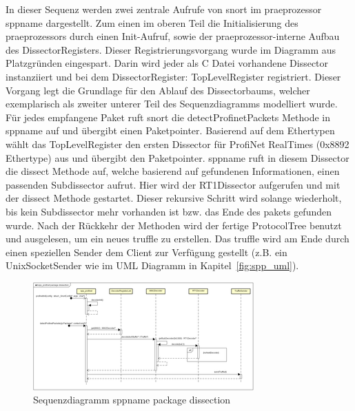 
In dieser Sequenz werden zwei zentrale Aufrufe von \gls{snort} im \gls{praeprozessor} \gls{sppname} dargestellt. Zum einen im oberen Teil die Initialisierung des \gls{praeprozessor}s durch einen Init-Aufruf, sowie der \gls{praeprozessor}-interne Aufbau des DissectorRegisters. Dieser Registrierungsvorgang wurde im Diagramm aus Platzgründen eingespart. Darin wird jeder als C Datei vorhandene Dissector instanziiert und bei dem DissectorRegister: TopLevelRegister registriert. Dieser Vorgang legt die Grundlage für den Ablauf des Dissectorbaums, welcher exemplarisch als zweiter unterer Teil des Sequenzdiagramms modelliert wurde. Für jedes empfangene Paket ruft \gls{snort} die detectProfinetPackets Methode in \gls{sppname} auf und übergibt einen Paketpointer. Basierend auf dem Ethertypen wählt das TopLevelRegister den ersten Dissector für ProfiNet RealTimes (0x8892 Ethertype) aus und übergibt den Paketpointer. \gls{sppname} ruft in diesem Dissector die dissect Methode auf, welche basierend auf gefundenen Informationen, einen passenden Subdissector aufrut. Hier wird der RT1Dissector aufgerufen und mit der dissect Methode gestartet. Dieser rekursive Schritt wird solange wiederholt, bis kein Subdissector mehr vorhanden ist bzw. das Ende des \gls{paket}s gefunden wurde.
Nach der Rückkehr der Methoden wird der fertige ProtocolTree benutzt und ausgelesen, um ein neues \gls{truffle} zu erstellen. Das \gls{truffle} wird am Ende durch einen speziellen Sender dem Client zur Verfügung gestellt (z.B. ein UnixSocketSender wie im UML Diagramm in Kapitel~\ref{fig:spp_uml}).

\begin{figure}[H]
  \centering
  \includegraphics[width=\textwidth]{../diagramimages/spp-profinet-package-dissection.png}
  \caption[Sequenzdiagramm \gls{sppname} package dissection]{Sequenzdiagramm \gls{sppname} package dissection}
  \label{fig:spp_sqd}
\end{figure} 